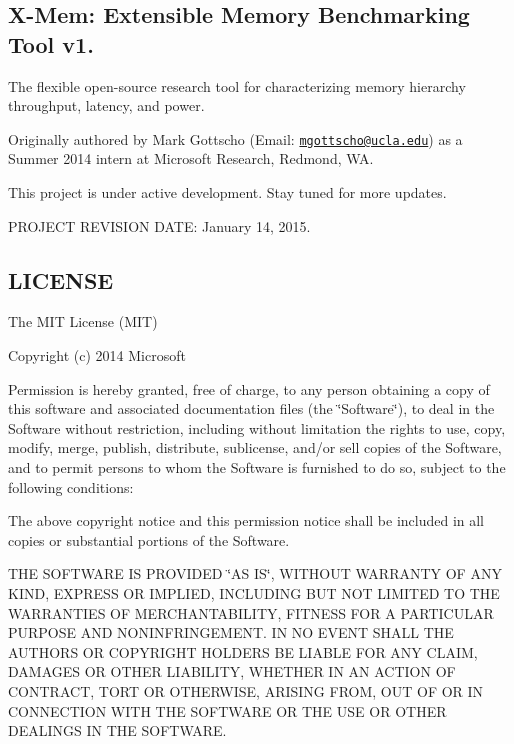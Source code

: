 \subsection*{X-\/\-Mem\-: Extensible Memory Benchmarking Tool v1. }

The flexible open-\/source research tool for characterizing memory hierarchy throughput, latency, and power.

Originally authored by Mark Gottscho (Email\-: \href{mailto:mgottscho@ucla.edu}{\tt mgottscho@ucla.\-edu}) as a Summer 2014 intern at Microsoft Research, Redmond, W\-A.

This project is under active development. Stay tuned for more updates.

P\-R\-O\-J\-E\-C\-T R\-E\-V\-I\-S\-I\-O\-N D\-A\-T\-E\-: January 14, 2015. 

 \subsection*{L\-I\-C\-E\-N\-S\-E }

The M\-I\-T License (M\-I\-T)

Copyright (c) 2014 Microsoft

Permission is hereby granted, free of charge, to any person obtaining a copy of this software and associated documentation files (the \char`\"{}\-Software\char`\"{}), to deal in the Software without restriction, including without limitation the rights to use, copy, modify, merge, publish, distribute, sublicense, and/or sell copies of the Software, and to permit persons to whom the Software is furnished to do so, subject to the following conditions\-:

The above copyright notice and this permission notice shall be included in all copies or substantial portions of the Software.

T\-H\-E S\-O\-F\-T\-W\-A\-R\-E I\-S P\-R\-O\-V\-I\-D\-E\-D \char`\"{}\-A\-S I\-S\char`\"{}, W\-I\-T\-H\-O\-U\-T W\-A\-R\-R\-A\-N\-T\-Y O\-F A\-N\-Y K\-I\-N\-D, E\-X\-P\-R\-E\-S\-S O\-R I\-M\-P\-L\-I\-E\-D, I\-N\-C\-L\-U\-D\-I\-N\-G B\-U\-T N\-O\-T L\-I\-M\-I\-T\-E\-D T\-O T\-H\-E W\-A\-R\-R\-A\-N\-T\-I\-E\-S O\-F M\-E\-R\-C\-H\-A\-N\-T\-A\-B\-I\-L\-I\-T\-Y, F\-I\-T\-N\-E\-S\-S F\-O\-R A P\-A\-R\-T\-I\-C\-U\-L\-A\-R P\-U\-R\-P\-O\-S\-E A\-N\-D N\-O\-N\-I\-N\-F\-R\-I\-N\-G\-E\-M\-E\-N\-T. I\-N N\-O E\-V\-E\-N\-T S\-H\-A\-L\-L T\-H\-E A\-U\-T\-H\-O\-R\-S O\-R C\-O\-P\-Y\-R\-I\-G\-H\-T H\-O\-L\-D\-E\-R\-S B\-E L\-I\-A\-B\-L\-E F\-O\-R A\-N\-Y C\-L\-A\-I\-M, D\-A\-M\-A\-G\-E\-S O\-R O\-T\-H\-E\-R L\-I\-A\-B\-I\-L\-I\-T\-Y, W\-H\-E\-T\-H\-E\-R I\-N A\-N A\-C\-T\-I\-O\-N O\-F C\-O\-N\-T\-R\-A\-C\-T, T\-O\-R\-T O\-R O\-T\-H\-E\-R\-W\-I\-S\-E, A\-R\-I\-S\-I\-N\-G F\-R\-O\-M, O\-U\-T O\-F O\-R I\-N C\-O\-N\-N\-E\-C\-T\-I\-O\-N W\-I\-T\-H T\-H\-E S\-O\-F\-T\-W\-A\-R\-E O\-R T\-H\-E U\-S\-E O\-R O\-T\-H\-E\-R D\-E\-A\-L\-I\-N\-G\-S I\-N T\-H\-E S\-O\-F\-T\-W\-A\-R\-E. 

